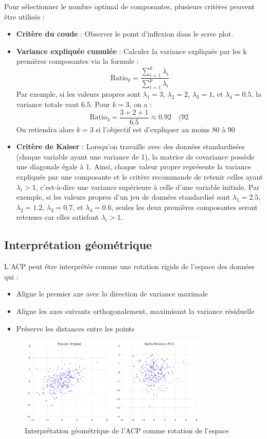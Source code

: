 \documentclass[a4paper,12pt]{report}
\begin{document}
Pour sélectionner le nombre optimal de composantes, plusieurs critères peuvent être utilisés :
\begin{itemize}
    \item \textbf{Critère du coude} : Observer le point d'inflexion dans le scree plot.
    \item \textbf{Variance expliquée cumulée} : 
    Calculer la variance expliquée par les k premières composantes via la formule :
    \[
    \text{Ratio}_k = \frac{\sum_{i=1}^k \lambda_i}{\sum_{i=1}^{p} \lambda_i}
    \]
    Par exemple, si les valeurs propres sont $\lambda_1=3$, $\lambda_2=2$, $\lambda_3=1$, et $\lambda_4=0.5$, la variance totale vaut $6.5$. Pour $k=3$, on a :
    \[
    \text{Ratio}_3 = \frac{3+2+1}{6.5}\approx 0.92 \quad (92\  
    \]
    On retiendra alors $k=3$ si l'objectif est d'expliquer au moins 80 à 90\  
    
    \item \textbf{Critère de Kaiser} : 
    Lorsqu'on travaille avec des données standardisées (chaque variable ayant une variance de 1), la matrice de covariance possède une diagonale égale à 1. Ainsi, chaque valeur propre représente la variance expliquée par une composante et le critère recommande de retenir celles ayant $\lambda_i > 1$, c'est-à-dire une variance supérieure à celle d'une variable initiale.
    Par exemple, si les valeurs propres d'un jeu de données standardisé sont $\lambda_1=2.5$, $\lambda_2=1.2$, $\lambda_3=0.7$, et $\lambda_4=0.6$, seules les deux premières composantes seront retenues car elles satisfont $\lambda_i > 1$.
\end{itemize}

\subsection{Interprétation géométrique}

L'ACP peut être interprétée comme une rotation rigide de l'espace des données qui :
\begin{itemize}
    \item Aligne le premier axe avec la direction de variance maximale
    \item Aligne les axes suivants orthogonalement, maximisant la variance résiduelle
    \item Préserve les distances entre les points
\end{itemize}

\begin{figure}[H]
    \centering
    \includegraphics[width=0.8\textwidth]{pca_geometric.png}
    \caption{Interprétation géométrique de l'ACP comme rotation de l'espace}
    \label{fig:pca_geometric}
\end{figure}
\end{document}
